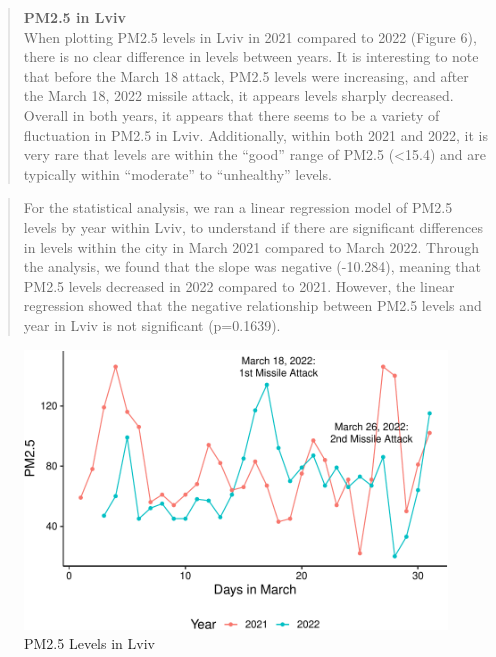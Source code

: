 \documentclass[
  12pt,
]{article}
\begin{document}
\newpage

\begin{quote}
\textbf{PM2.5 in Lviv}\\
When plotting PM2.5 levels in Lviv in 2021 compared to 2022 (Figure 6),
there is no clear difference in levels between years. It is interesting
to note that before the March 18 attack, PM2.5 levels were increasing,
and after the March 18, 2022 missile attack, it appears levels sharply
decreased. Overall in both years, it appears that there seems to be a
variety of fluctuation in PM2.5 in Lviv. Additionally, within both 2021
and 2022, it is very rare that levels are within the ``good'' range of
PM2.5 (\textless15.4) and are typically within ``moderate'' to
``unhealthy'' levels.
\end{quote}

\begin{quote}
For the statistical analysis, we ran a linear regression model of PM2.5
levels by year within Lviv, to understand if there are significant
differences in levels within the city in March 2021 compared to March
2022. Through the analysis, we found that the slope was negative
(-10.284), meaning that PM2.5 levels decreased in 2022 compared to 2021.
However, the linear regression showed that the negative relationship
between PM2.5 levels and year in Lviv is not significant (p=0.1639).
\end{quote}

\begin{figure}
\centering
\includegraphics{Fontanie_Gordon_Weinberg_Project_files/figure-latex/visualizing PM25 in Lviv-1.pdf}
\caption{PM2.5 Levels in Lviv}
\end{figure}
\end{document}

